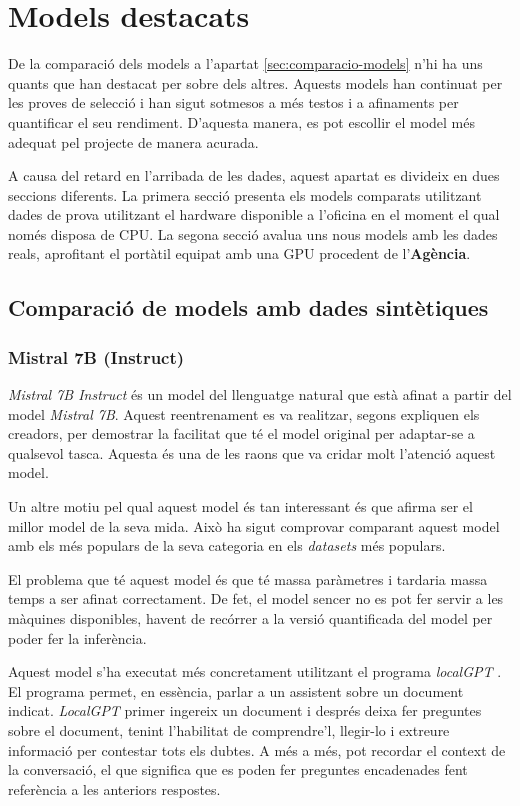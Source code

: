 \section{Models destacats}
De la comparació dels models a l'apartat \ref{sec:comparacio-models} n'hi ha uns quants que han destacat per sobre dels altres. Aquests models han continuat per les proves de selecció i han sigut sotmesos a més testos i a afinaments per quantificar el seu rendiment. D'aquesta manera, es pot escollir el model més adequat pel projecte de manera acurada.

A causa del retard en l'arribada de les dades, aquest apartat es divideix en dues seccions diferents. La primera secció presenta els models comparats utilitzant dades de prova utilitzant el hardware disponible a l'oficina en el moment el qual només disposa de CPU. La segona secció avalua uns nous models amb les dades reals, aprofitant el portàtil equipat amb una GPU procedent de l'\textbf{Agència}.

\subsection{Comparació de models amb dades sintètiques}
\subsubsection{Mistral 7B (Instruct)}
\textit{Mistral 7B Instruct} \cite{mistral} és un model del llenguatge natural que està afinat a partir del model \textit{Mistral 7B}. Aquest reentrenament es va realitzar, segons expliquen els creadors, per demostrar la facilitat que té el model original per adaptar-se a qualsevol tasca. Aquesta és una de les raons que va cridar molt l'atenció aquest model.

Un altre motiu pel qual aquest model és tan interessant és que afirma ser el millor model de la seva mida. Això ha sigut comprovar comparant aquest model amb els més populars de la seva categoria en els \textit{datasets} més populars.

El problema que té aquest model és que té massa paràmetres i tardaria massa temps a ser afinat correctament. De fet, el model sencer no es pot fer servir a les màquines disponibles, havent de recórrer a la versió quantificada del model per poder fer la inferència. 

Aquest model s'ha executat més concretament utilitzant el programa \textit{localGPT} \cite{localgpt}. El programa permet, en essència, parlar a un assistent sobre un document indicat. \textit{LocalGPT} primer ingereix un document i després deixa fer preguntes sobre el document, tenint l'habilitat de comprendre'l, llegir-lo i extreure informació per contestar tots els dubtes. A més a més, pot recordar el context de la conversació, el que significa que es poden fer preguntes encadenades fent referència a les anteriors respostes.

